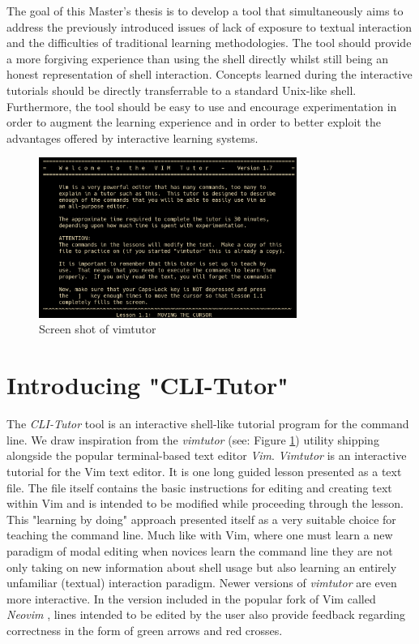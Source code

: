 The goal of this Master's thesis is to develop a tool that simultaneously aims
to address the previously introduced issues of lack of exposure to textual
interaction and the difficulties of traditional learning methodologies. The
tool should provide a more forgiving experience than using the shell directly
whilst still being an honest representation of shell interaction. Concepts
learned during the interactive tutorials should be directly transferrable to a
standard Unix-like shell. Furthermore, the tool should be easy to use and
encourage experimentation in order to augment the learning experience and in
order to better exploit the advantages offered by interactive learning systems.


\begin{figure}[htbp]
	\centering 
	\includegraphics[width=0.75\textwidth]{img/vimtutor}
	\caption{Screen shot of vimtutor}
	\label{fig:vimtutor}
\end{figure}

\section{Introducing "CLI-Tutor"}

The \textit{CLI-Tutor} tool is an interactive shell-like tutorial program for
the command line. We draw inspiration from the
\textit{vimtutor}\cite{pierce_ware_smith_moolenaar_2019} (see: Figure
\ref{fig:vimtutor}) utility shipping alongside the popular terminal-based text
editor \textit{Vim}. \textit{Vimtutor} is an interactive tutorial for the Vim text
editor. It is one long guided lesson presented as a text file. The file itself
contains the basic instructions for editing and creating text within Vim and is
intended to be modified while proceeding through the lesson. This "learning by
doing" approach presented itself as a very suitable choice for teaching the
command line. Much like with Vim, where one must learn a new paradigm of modal
editing when novices learn the command line they are not only taking on new
information about shell usage but also learning an entirely unfamiliar
(textual) interaction paradigm. Newer versions of \textit{vimtutor} are even more
interactive. In the version included in the popular fork of Vim called \textit{Neovim}
\cite{neovimHomeNeovim}, lines intended to be edited by the user also provide
feedback regarding correctness in the form of green arrows and red crosses.

